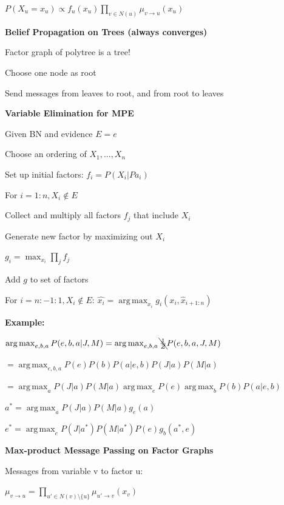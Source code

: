 \documentclass[a4paper, 11pt, landscape]{article}
\DeclareMathOperator*{\argmax}{arg\,max}
\begin{document}
\begin{multicols*}{3}
	$P(X_u = x_u) \propto f_u(x_u) \prod_{v \in N(u)} \mu_{v \rightarrow u} (x_u)$

	\textbf{Belief Propagation on Trees (always converges)}
	\begin{compactitem}
		\item Factor graph of polytree is a tree!
		\item Choose one node as root
		\item Send messages from leaves to root, and from root to leaves
	\end{compactitem}
   
\textbf{Variable Elimination for MPE}	
	\begin{compactitem}
	\item Given BN and evidence $E=e$
	\item Choose an ordering of $X_1, ...,X_n$
	\item Set up initial factors: $f_i = P(X_i | Pa_i)$
	\item For $i=1:n, X_i \notin  E$
  	\begin{compactenum}
  	\item Collect and multiply all factors $f_j$ that include $X_i$   
  	\item Generate new factor by maximizing out $X_i$
  	
	$g_i = \max_{x_i} \prod_{j} f_j$
  	\item Add $g$ to set of factors
  	\end{compactenum}
	\item For $i=n:-1:1, X_i \notin  E$:  $\hat{x_i} = \argmax_{x_i} g_i(x_i, \hat{x}_{i+1:n})$
\end{compactitem}

\textbf{Example: }

$\argmax_{e , b, a} P(e,b,a| J, M) = \argmax_{e , b, a} \bcancel{\frac{1}{Z}} P(e,b,a, J,M)$

$= \argmax_{e , b, a} P(e)P(b)P(a|e,b)P(J|a)P(M|a)$

$= \argmax_{a} P(J|a)P(M|a)  \argmax_{e} P(e)  \argmax_{b} P(b)P(a|e,b)$

$a^{*} = \argmax_{a} P(J|a)P(M|a) g_e(a)$

$e^{*} = \argmax_{e} P(J|a^*)P(M|a^*) P(e) g_b(a^*,e)$


\textbf{Max-product Message Passing on Factor Graphs}

Messages from variable v to factor u: 

$\mu_{v \rightarrow u} = \prod_{u' \in N(v) \setminus \{u\}} \mu_{u' \rightarrow v}(x_{v})$ 


\end{multicols*}
\end{document}
